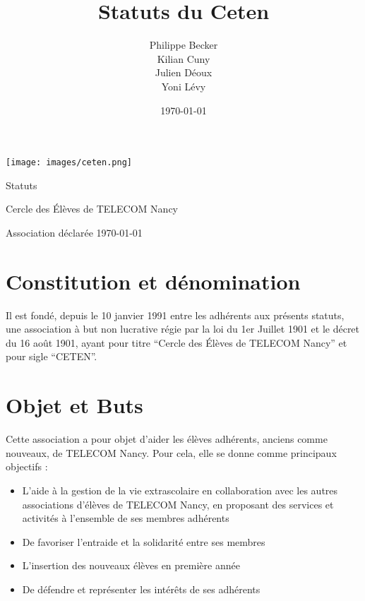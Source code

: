 \documentclass{article} %
\title{Statuts du Ceten}
\author{Philippe Becker\\
	Kilian Cuny\\
	Julien Déoux\\
	Yoni Lévy}
\date\today
\begin{document}

	
	\begin{titlepage}
		\begin{center}
			\texttt{[image: images/ceten.png]}\par
			\vspace{3cm}
			{\Huge \light Statuts}\par
			\vfill
			{\large Cercle des Élèves de TELECOM Nancy}\par
			{\large \light Association déclarée}
			\vfill
			{\light \today}\par
		\end{center}
	\end{titlepage}

	



	\section{Constitution et dénomination}
		Il est fondé, depuis le 10 janvier 1991 entre les adhérents aux présents
		statuts, une association à but non lucrative régie par la loi du 1er Juillet
		1901 et le décret du 16 août 1901, ayant pour titre “Cercle des Élèves de
		TELECOM Nancy” et pour sigle “CETEN”.

	\section{Objet et Buts}
	\label{sec:objet}
		Cette association a pour objet d’aider les élèves adhérents, anciens comme
		nouveaux, de TELECOM Nancy. Pour cela, elle se donne comme principaux
		objectifs :
		\begin{itemize}
			\item L’aide à la gestion de la vie extrascolaire en collaboration avec
			    les autres associations d'élèves de TELECOM Nancy, en proposant des
			    services et activités à l’ensemble de ses membres adhérents
			\item De favoriser l’entraide et la solidarité entre ses membres
			\item L’insertion des nouveaux élèves en première année
			\item De défendre et représenter les intérêts de ses adhérents
		\end{itemize}
\end{document}
